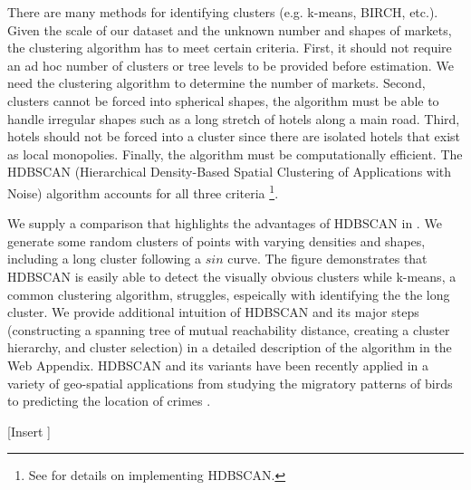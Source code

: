 \documentclass[mksc,blindrev]{informs3} %
\begin{document}
There are many methods for identifying clusters (e.g. k-means, BIRCH, etc.). Given the scale of our dataset and the unknown number and shapes of markets, the clustering algorithm has to meet certain criteria. First, it should not require an ad hoc number of clusters or tree levels to be provided before estimation. We need the clustering algorithm to determine the number of markets. Second, clusters cannot be forced into spherical shapes, the algorithm must be able to handle irregular shapes such as a long stretch of hotels along a main road.  Third, hotels should not be forced into a cluster since there are isolated hotels that exist as local monopolies. Finally, the algorithm must be computationally efficient.  The HDBSCAN (Hierarchical Density-Based Spatial Clustering of Applications with Noise) algorithm accounts for all three criteria \citep{campello2013density,mcinnes2017hdbscan}\footnote{See \citet{mcinnes2017hdbscan} for details on implementing HDBSCAN.}. 

We supply a comparison that highlights the advantages of HDBSCAN in . We generate some random clusters of points with varying densities and shapes, including a long cluster following a $sin$ curve. The figure demonstrates that HDBSCAN is easily able to detect the visually obvious clusters while k-means, a common clustering algorithm, struggles, espeically with identifying the the long cluster. We provide additional intuition of HDBSCAN and its major steps (constructing a spanning tree of mutual reachability distance, creating a cluster hierarchy, and cluster selection) in a detailed description of the algorithm in the Web Appendix. HDBSCAN and its variants have been recently applied in a variety of geo-spatial applications from studying the migratory patterns of birds \citep{tang2009discovery} to predicting the location of crimes \citep{bappee2018predicting}. 

[Insert ]
\end{document}
